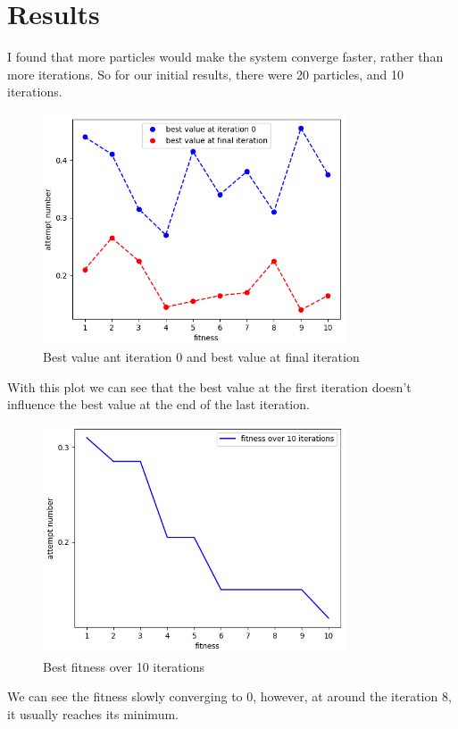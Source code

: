 \documentclass[a4paper]{article}
\begin{document}
\section{Results}
I found that more particles would make the system converge faster, rather than more iterations. So for our initial results, there were 20 particles, and 10 iterations.

\begin{figure}[H]
\center
\includegraphics[width=0.8\textwidth]{images/best_fit.PNG}
\caption{Best value ant iteration 0 and best value at final iteration}
\end{figure}
With this plot we can see that the best value at the first iteration doesn't influence the best value at the end of the last iteration.

\begin{figure}[H]
\center
\includegraphics[width=0.8\textwidth]{images/fit_over_10.PNG}
\caption{Best fitness over 10 iterations}
\end{figure}
We can see the fitness slowly converging to 0, however, at around the iteration 8, it usually reaches its minimum.
\end{document}
